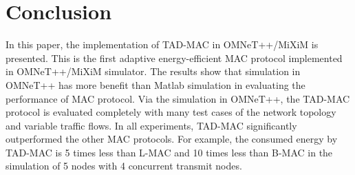 \documentclass[conference]{IEEEtran}
\begin{document}
\section{Conclusion}
In this paper, the implementation of TAD-MAC in OMNeT++/MiXiM is presented. This is the first adaptive energy-efficient MAC protocol implemented in OMNeT++/MiXiM simulator. The results show that simulation in OMNeT++ has more benefit than Matlab simulation in evaluating the performance of MAC protocol. Via the simulation in OMNeT++, the TAD-MAC protocol is evaluated completely with many test cases of the network topology and variable traffic flows. In all experiments, TAD-MAC significantly outperformed the other MAC protocols. For example, the consumed energy by TAD-MAC is 5 times less than L-MAC and 10 times less than B-MAC in the simulation of 5 nodes with 4 concurrent transmit nodes.



\end{document}

